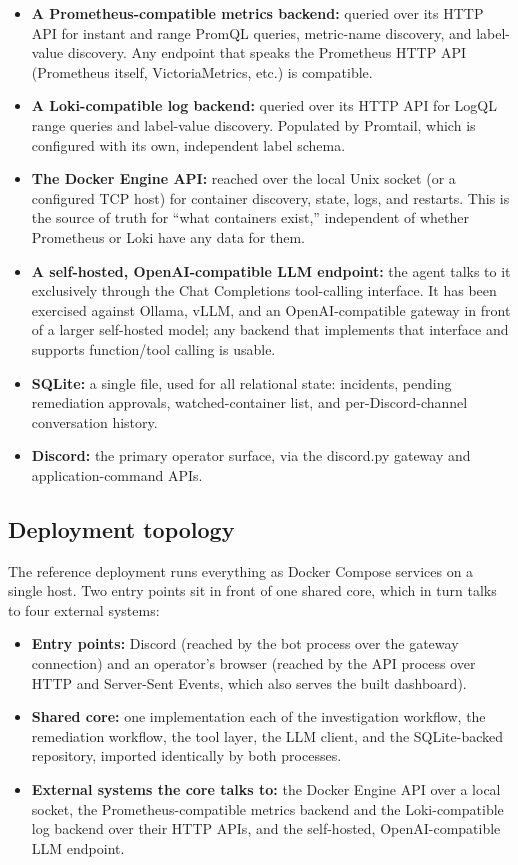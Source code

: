 \documentclass[11pt]{article}
\begin{document}
\begin{itemize}
  \item \textbf{A Prometheus-compatible metrics backend:} queried over its
    HTTP API for instant and range PromQL queries, metric-name discovery,
    and label-value discovery. Any endpoint that speaks the Prometheus HTTP
    API (Prometheus itself, VictoriaMetrics, etc.) is compatible.
  \item \textbf{A Loki-compatible log backend:} queried over its HTTP API
    for LogQL range queries and label-value discovery. Populated by
    Promtail, which is configured with its own, independent label schema.
  \item \textbf{The Docker Engine API:} reached over the local Unix socket
    (or a configured TCP host) for container discovery, state, logs, and
    restarts. This is the source of truth for ``what containers exist,''
    independent of whether Prometheus or Loki have any data for them.
  \item \textbf{A self-hosted, OpenAI-compatible LLM endpoint:} the agent
    talks to it exclusively through the Chat Completions tool-calling
    interface. It has been exercised against Ollama, vLLM, and an
    OpenAI-compatible gateway in front of a larger self-hosted model; any
    backend that implements that interface and supports function/tool
    calling is usable.
  \item \textbf{SQLite:} a single file, used for all relational state:
    incidents, pending remediation approvals, watched-container list, and
    per-Discord-channel conversation history.
  \item \textbf{Discord:} the primary operator surface, via the discord.py
    gateway and application-command APIs.
\end{itemize}

\subsection{Deployment topology}

The reference deployment runs everything as Docker Compose services on a
single host. Two entry points sit in front of one shared core, which in turn
talks to four external systems:

\begin{itemize}
  \item \textbf{Entry points:} Discord (reached by the bot process over the
    gateway connection) and an operator's browser (reached by the API
    process over HTTP and Server-Sent Events, which also serves the built
    dashboard).
  \item \textbf{Shared core:} one implementation each of the investigation
    workflow, the remediation workflow, the tool layer, the LLM client, and
    the SQLite-backed repository, imported identically by both processes.
  \item \textbf{External systems the core talks to:} the Docker Engine API
    over a local socket, the Prometheus-compatible metrics backend and the
    Loki-compatible log backend over their HTTP APIs, and the self-hosted,
    OpenAI-compatible LLM endpoint.
\end{itemize}
\end{document}

